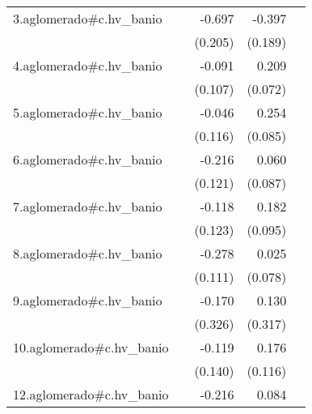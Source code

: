 {\begin{longtable}{l*{4}{D{.}{.}{-1}}}
\addlinespace
3.aglomerado#c.hv\_banio&                     &      -0.697\sym{***}&      -0.397\sym{*}  &                     \\
            &                     &     (0.205)         &     (0.189)         &                     \\
\addlinespace
4.aglomerado#c.hv\_banio&                     &      -0.091         &       0.209\sym{**} &                     \\
            &                     &     (0.107)         &     (0.072)         &                     \\
\addlinespace
5.aglomerado#c.hv\_banio&                     &      -0.046         &       0.254\sym{**} &                     \\
            &                     &     (0.116)         &     (0.085)         &                     \\
\addlinespace
6.aglomerado#c.hv\_banio&                     &      -0.216         &       0.060         &                     \\
            &                     &     (0.121)         &     (0.087)         &                     \\
\addlinespace
7.aglomerado#c.hv\_banio&                     &      -0.118         &       0.182         &                     \\
            &                     &     (0.123)         &     (0.095)         &                     \\
\addlinespace
8.aglomerado#c.hv\_banio&                     &      -0.278\sym{*}  &       0.025         &                     \\
            &                     &     (0.111)         &     (0.078)         &                     \\
\addlinespace
9.aglomerado#c.hv\_banio&                     &      -0.170         &       0.130         &                     \\
            &                     &     (0.326)         &     (0.317)         &                     \\
\addlinespace
10.aglomerado#c.hv\_banio&                     &      -0.119         &       0.176         &                     \\
            &                     &     (0.140)         &     (0.116)         &                     \\
\addlinespace
12.aglomerado#c.hv\_banio&                     &      -0.216         &       0.084         &                     \\

\end{longtable}}
